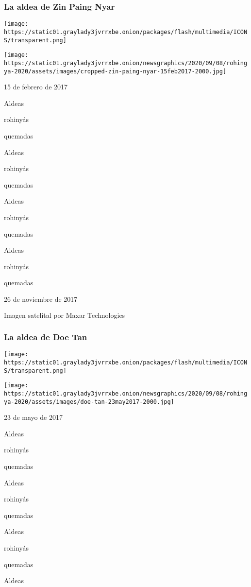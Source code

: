\hypertarget{la-aldea-de-zin-paing-nyar}{%
\subsubsection{La aldea de Zin Paing
Nyar}\label{la-aldea-de-zin-paing-nyar}}

\texttt{[image: https://static01.graylady3jvrrxbe.onion/packages/flash/multimedia/ICONS/transparent.png]}

\texttt{[image: https://static01.graylady3jvrrxbe.onion/newsgraphics/2020/09/08/rohingya-2020/assets/images/cropped-zin-paing-nyar-15feb2017-2000.jpg]}

15 de febrero de 2017

Aldeas

rohinyás

quemadas

Aldeas

rohinyás

quemadas

Aldeas

rohinyás

quemadas

Aldeas

rohinyás

quemadas

26 de noviembre de 2017

Imagen satelital por Maxar Technologies

\hypertarget{la-aldea-de-doe-tan}{%
\subsubsection{La aldea de Doe Tan}\label{la-aldea-de-doe-tan}}

\texttt{[image: https://static01.graylady3jvrrxbe.onion/packages/flash/multimedia/ICONS/transparent.png]}

\texttt{[image: https://static01.graylady3jvrrxbe.onion/newsgraphics/2020/09/08/rohingya-2020/assets/images/doe-tan-23may2017-2000.jpg]}

23 de mayo de 2017

Aldeas

rohinyás

quemadas

Aldeas

rohinyás

quemadas

Aldeas

rohinyás

quemadas

Aldeas

